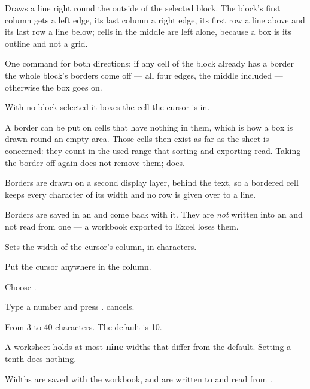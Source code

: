 
Draws a line right round the outside of the selected block. The block's
first column gets a left edge, its last column a right edge, its first row a
line above and its last row a line below; cells in the middle are left
alone, because a box is its outline and not a grid.

One command for both directions: if any cell of the block already has a
border the whole block's borders come off --- all four edges, the middle
included --- otherwise the box goes on.

With no block selected it boxes the cell the cursor is in.

A border can be put on cells that have nothing in them, which is how a box
is drawn round an empty area. Those cells then exist as far as the sheet is
concerned: they count in the used range that sorting and exporting read.
Taking the border off again does not remove them; 
does.

\begin{ccnote}
Borders are drawn on a second display layer, behind the text, so a bordered
cell keeps every character of its width and no row is given over to a line.
\end{ccnote}

\begin{cccaution}
Borders are saved in an  and come back with it. They are
\emph{not} written into an  and not read from one --- a
workbook exported to Excel loses them.
\end{cccaution}


Sets the width of the cursor's column, in characters.

\begin{ccprocedure}[]
\item Put the cursor anywhere in the column.
\item Choose .
\item Type a number and press .  cancels.
\end{ccprocedure}

\begin{ccsteps}
\item From 3 to 40 characters. The default is 10.
\item A worksheet holds at most \textbf{nine} widths that differ from the
default. Setting a tenth does nothing.
\item Widths are saved with the workbook, and are written to and read from
.
\end{ccsteps}

